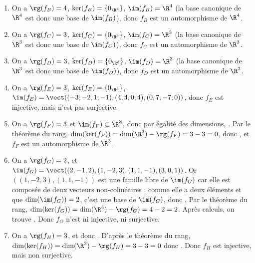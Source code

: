 \documentclass[a4paper, 11pt,reqno]{article}
\begin{document}
\begin{correction}
\begin{enumerate}
		\item On a $\rg (f_B) = 4$, $\ker (f_B) = \{0_{\R^4}\}$, $\im (f_B) = \R^4$ (la base canonique de $\R^4$ est donc une base de $\im (f_B)$), donc $f_B$ est un automorphisme de $\R^4$.
		\item On a $\rg (f_C) = 3$, $\ker (f_C) = \{0_{\R^3}\}$, $\im (f_C) = \R^3$ (la base canonique de $\R^3$ est donc une base de $\im (f_C)$), donc $f_C$ est un automorphisme de $\R^3$.
		\item On a $\rg (f_D) = 3$, $\ker (f_D) = \{0_{\R^3}\}$, $\im (f_D) = \R^3$ (la base canonique de $\R^3$ est donc une base de $\im (f_D)$), donc $f_D$ est un automorphisme de $\R^3$.
		\item On a $\rg (f_E) = 3$, $\ker (f_E) = \{0_{\R^3}\}$, $\im (f_E) = \vect((-3,-2,1,-1),(4,4,0,4),(0,7,-7,0))$, donc $f_E$ est injective, mais n'est pas surjective.
		\item On a $\rg(f_F)=3$ et $\im(f_F)\subset \R^3$, donc par \'egalit\'e des dimensions, . Par le th\'eor\`eme du rang, $\dim(\ker(f_F)) = \dim(\R^3)-\rg(f_F)= 3 - 3 = 0$, donc , et $f_F$ est un automorphisme de $\R^3$.\\
		\item On a $\rg(f_G)=2$, et $\im(f_G)=\vect((2,-1,2),(1,-2,3),(1,1,-1),(3,0,1))$. Or $((1,-2,3),(1,1,-1))$ est une famille libre de $\im(f_G)$ car elle est compos\'ee de deux vecteurs non-colin\'eaires : comme elle a deux \'el\'ements et que $\dim(\im(f_G))=2$, c'est une base de $\im(f_G)$, donc . Par le th\'eor\`eme du rang, $\dim(\ker(f_G))= \dim(\R^4) - \rg(f_G)= 4-2 =2$. Apr\`es calculs, on trouve . Donc $f_G$ n'est ni injective, ni surjective.\\
		\item On a $\rg(f_H)=3$, et donc . D'apr\`es le th\'eor\`eme du rang, $\dim(\ker(f_H))=\dim(\R^3) - \rg(f_H) = 3-3=0$ donc . Donc $f_H$ est injective, mais non surjective.
	\end{enumerate}
\end{correction}
\end{document}
